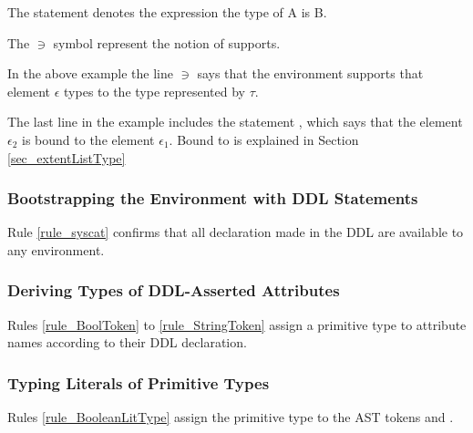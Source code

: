 The statement  denotes the expression the type of A is B.

The $\ni$ symbol represent the notion of supports.

In the above example the line \environment $\ni$ \typeof{$\epsilon$}{$\tau$} says that the environment supports that element $\epsilon$ types to the type represented by $\tau$.

The last line in the example includes the statement ,
which says that the element $\epsilon_2$ is bound to the element $\epsilon_1$.
Bound to is explained in Section \ref{sec_extentListType}



\setcounter{equation}{0}


\subsubsection{Bootstrapping the Environment with DDL Statements} 

Rule \ref{rule_syscat} confirms that all declaration made in the DDL are available to any environment.

\subsubsection{Deriving Types of DDL-Asserted Attributes} 
Rules \ref{rule_BoolToken} to \ref{rule_StringToken} assign a primitive type to attribute names according to their DDL declaration.





\subsubsection{Typing Literals of Primitive Types}
Rules \ref{rule_BooleanLitType} assign the primitive type  to the AST tokens  and .

